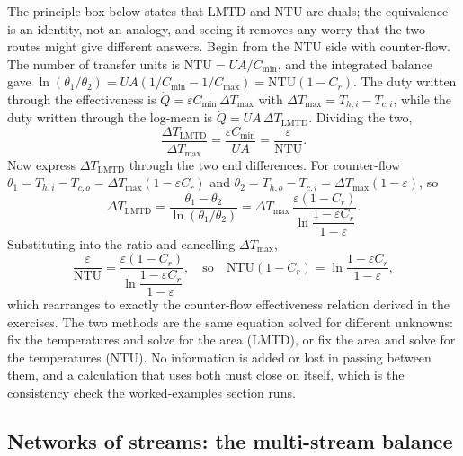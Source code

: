The principle box below states that LMTD and NTU are duals; the equivalence is an
identity, not an analogy, and seeing it removes any worry that the two routes might
give different answers. Begin from the NTU side with counter-flow. The number of
transfer units is $\text{NTU} = UA/C_{\min}$, and the integrated balance gave
$\ln(\theta_1/\theta_2) = UA(1/C_{\min} - 1/C_{\max}) = \text{NTU}(1 - C_r)$. The
duty written through the effectiveness is $\dot{Q} = \varepsilon C_{\min}\,\Delta
T_{\max}$ with $\Delta T_{\max} = T_{h,i} - T_{c,i}$, while the duty written
through the log-mean is $\dot{Q} = UA\,\Delta T_{\text{LMTD}}$. Dividing the two,
\[
\frac{\Delta T_{\text{LMTD}}}{\Delta T_{\max}}
= \frac{\varepsilon C_{\min}}{UA}
= \frac{\varepsilon}{\text{NTU}}.
\]
Now express $\Delta T_{\text{LMTD}}$ through the two end differences. For
counter-flow $\theta_1 = T_{h,i} - T_{c,o} = \Delta T_{\max}(1 - \varepsilon C_r)$
and $\theta_2 = T_{h,o} - T_{c,i} = \Delta T_{\max}(1 - \varepsilon)$, so
\[
\Delta T_{\text{LMTD}}
= \frac{\theta_1 - \theta_2}{\ln(\theta_1/\theta_2)}
= \Delta T_{\max}\,\frac{\varepsilon(1 - C_r)}{\ln\!\dfrac{1 - \varepsilon C_r}{1 - \varepsilon}}.
\]
Substituting into the ratio and cancelling $\Delta T_{\max}$,
\[
\frac{\varepsilon}{\text{NTU}}
= \frac{\varepsilon(1 - C_r)}{\ln\!\dfrac{1 - \varepsilon C_r}{1 - \varepsilon}},
\quad\text{so}\quad
\text{NTU}(1 - C_r) = \ln\frac{1 - \varepsilon C_r}{1 - \varepsilon},
\]
which rearranges to exactly the counter-flow effectiveness relation derived in the
exercises. The two methods are the same equation solved for different unknowns: fix
the temperatures and solve for the area (LMTD), or fix the area and solve for the
temperatures (NTU). No information is added or lost in passing between them, and a
calculation that uses both must close on itself, which is the consistency check the
worked-examples section runs.

\subsection{Networks of streams: the multi-stream balance}


